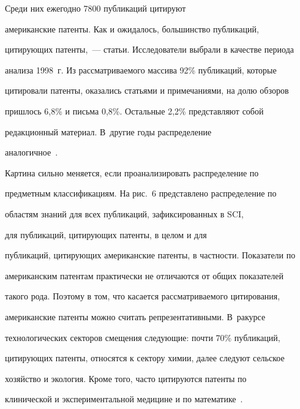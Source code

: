 Среди них ежегодно 7800 публикаций цитируют 


американские патенты. Как и ожидалось, большинство публикаций, 


цитирующих патенты,~--- статьи. Исследователи выбрали в качестве периода 


анализа 1998~г. Из рассматриваемого массива 92\% публикаций, которые 


цитировали патенты, оказались статьями и примечаниями, на долю обзоров 


пришлось 6,8\% и письма 0,8\%. Остальные 2,2\% представляют собой 


редакционный материал. В~другие годы распределение 


аналогичное~\cite{22-koz}. 








       


     Картина сильно меняется, если проанализировать распределение по 


предметным классификациям. На рис.~6 представлено распределение по 


областям знаний для всех публикаций, зафиксированных в SCI, 


для публикаций, цитирующих патенты, в целом и для 


публикаций, цитирующих американские патенты, в частности. Показатели по 


американским патентам практически не отличаются от общих показателей 


такого рода. Поэтому в том, что касается рассматриваемого цитирования, 


американские патенты можно считать репрезентативными. В~ракурсе 


технологических секторов смещения следующие: почти 70\% публикаций, 


цитирующих патенты, относятся к сектору химии, далее следуют сельское 


хозяйство и экология. Кроме того, часто цитируются патенты по 


клинической и экспериментальной медицине и по математике~\cite{22-koz}. 





